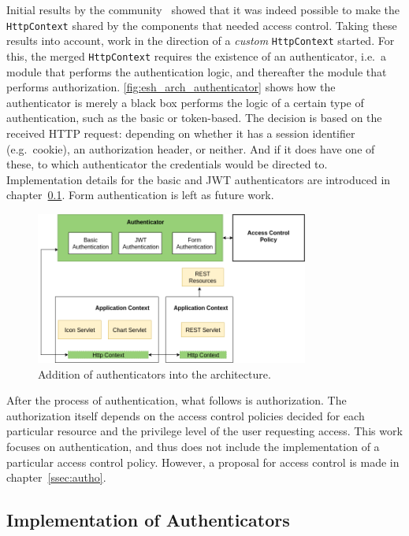 \documentclass[12pt]{article}
\begin{document}
Initial results by the community~\cite{esh_03} showed that it was indeed possible to make the \texttt{HttpContext} shared by the components that needed access control. Taking these results into account, work in the direction of a \emph{custom} \texttt{HttpContext} started. For this, the merged \texttt{HttpContext} requires the existence of an authenticator, i.e.\ a module that performs the authentication logic, and thereafter the module that performs authorization. \autoref{fig:esh_arch_authenticator} shows how the authenticator is merely a black box performs the logic of a certain type of authentication, such as the basic or token-based. The decision is based on the received HTTP request: depending on whether it has a session identifier (e.g.\ cookie), an authorization header, or neither. And if it does have one of these, to which authenticator the credentials would be directed to. Implementation details for the basic and JWT authenticators are introduced in chapter~\ref{ssec:impl}. Form authentication is left as future work. 

\begin{figure} [ht] 
\begin{center}
\includegraphics[width=0.8\textwidth]{esh_arch_authenticator}
\caption{Addition of authenticators into the architecture.}
\label{fig:esh_arch_authenticator}
\end{center}
\end{figure}

After the process of authentication, what follows is authorization. The authorization itself depends on the access control policies decided for each particular resource and the privilege level of the user requesting access. This work focuses on authentication, and thus does not include the implementation of a particular access control policy. However, a proposal for access control is made in chapter~\ref{ssec:autho}.

\subsection{Implementation of Authenticators}
\label{ssec:impl}
\end{document}
